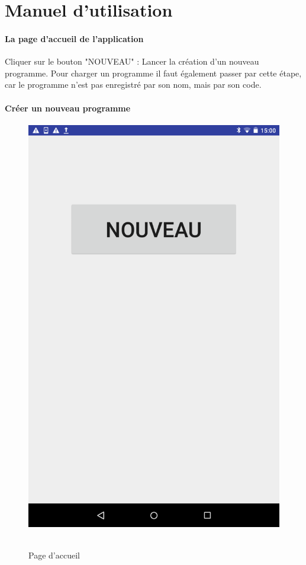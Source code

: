 \documentclass[12pt,francais]{report}
\begin{document}
\section*{Manuel d'utilisation}

\paragraph*{La page d'accueil de l'application\\}

Cliquer sur le bouton "NOUVEAU" : Lancer la création d'un nouveau programme. Pour charger un programme il faut également passer par cette étape, car le programme n'est pas enregistré par son nom, mais par son code.

\paragraph*{Créer un nouveau programme\\}

\begin{figure}[!h]
\centering
\includegraphics[scale=0.15]{./images/new.png}~\\[1.5cm]
\caption{Page d'accueil}
\end{figure}
\end{document}
